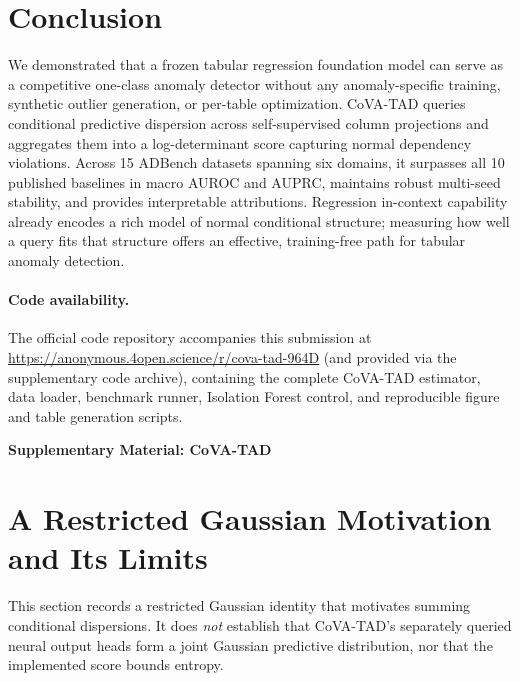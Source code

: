 \documentclass{article}
\begin{document}
\section{Conclusion}
\label{sec:conclusion}

We demonstrated that a frozen tabular regression foundation model can serve as a competitive one-class anomaly detector without any anomaly-specific training, synthetic outlier generation, or per-table optimization. CoVA-TAD queries conditional predictive dispersion across self-supervised column projections and aggregates them into a log-determinant score capturing normal dependency violations. Across 15 ADBench datasets spanning six domains, it surpasses all 10 published baselines in macro AUROC and AUPRC, maintains robust multi-seed stability, and provides interpretable attributions. Regression in-context capability already encodes a rich model of normal conditional structure; measuring how well a query fits that structure offers an effective, training-free path for tabular anomaly detection.

\paragraph{Code availability.}
The official code repository accompanies this submission at \url{https://anonymous.4open.science/r/cova-tad-964D} (and provided via the supplementary code archive), containing the complete CoVA-TAD estimator, data loader, benchmark runner, Isolation Forest control, and reproducible figure and table generation scripts.





\newpage
\appendix
\begin{center}
{\LARGE \bf Supplementary Material: CoVA-TAD}
\end{center}
\vspace{1.5em}

\section{A Restricted Gaussian Motivation and Its Limits}
\label{app:score-deriv}

This section records a restricted Gaussian identity that motivates summing conditional dispersions. It does \emph{not} establish that CoVA-TAD's separately queried neural output heads form a joint Gaussian predictive distribution, nor that the implemented score bounds entropy.
\end{document}
